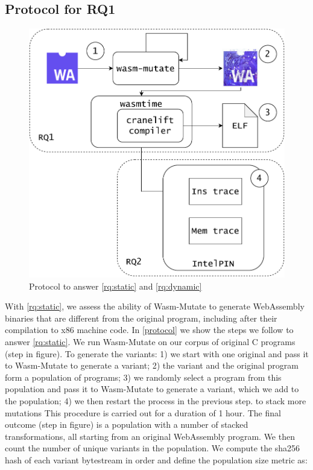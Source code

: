 \documentclass[a4paper,fleqn]{cas-dc}
\newcommand{\tool}{{\sc Wasm-Mutate}\xspace}
\newcommand{\Wasm}{WebAssembly\xspace}
\newcommand{\wasm}{\Wasm}
\newcommand*\step[1]{
\noindent\tikz[baseline=(char.base)]{
        \node[shape=circle,text=black,draw=black, fill=white,inner sep=1.2pt] (char) {#1};}}
\begin{document}
\subsection{Protocol for RQ1}
\label{protocol:rq1}

\begin{figure}
    \centering
    \includegraphics[width=0.8\linewidth]{figures/protocol.pdf}
    \caption{Protocol to answer \ref{rq:static} and \ref{rq:dynamic}}
  \label{protocol}
\end{figure}


With \ref{rq:static},
we assess the ability of \tool to generate \Wasm binaries that are different from the original program, including after their compilation to x86 machine code.
In \autoref{protocol} we show the steps we follow to answer \ref{rq:static}.
We run \tool on our corpus of \nProgramsRosetta{} original C programs (step \step{1} in figure). 
To generate the variants:
1) we start with one original and pass it to \tool to generate a variant;  
2) the variant and the original program form a population of programs; 
3) we randomly select a program from this population and pass it to \tool to generate a variant, which we add to the population; 
4) we then restart the process in the previous step. to stack more mutations 
This procedure is carried out for a duration of 1 hour.
The final outcome (step \step{2} in figure) is a population with a number of stacked transformations, all starting from an original \wasm program.
We then count the number of unique variants in the population.
We compute the sha256 hash of each variant bytestream in order and define the population size metric as: 
\end{document}
